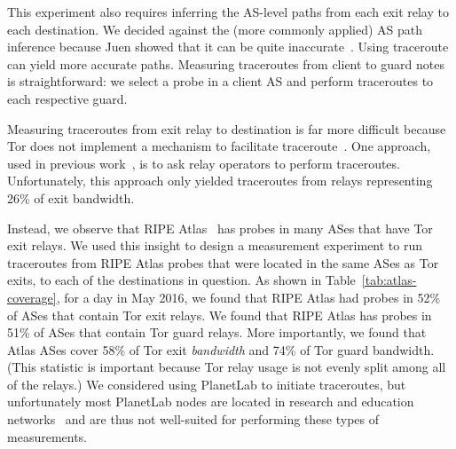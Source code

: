 This experiment also requires inferring the AS-level paths from
each exit relay to each destination. We decided against the (more
commonly applied) AS path inference because Juen \ea showed that it can
be quite inaccurate~\cite{Juen2015a}.  Using traceroute can yield more
accurate paths.  Measuring traceroutes from client to guard notes is
straightforward: we select a probe in a client AS and perform
traceroutes to each respective guard. 

Measuring traceroutes from exit relay to destination is far more
difficult because Tor does not implement a mechanism to facilitate
traceroute~\cite{Murdoch2007a}.  One approach, used in previous
work~\cite{Juen2015a}, is to ask relay operators to perform traceroutes.
Unfortunately, this approach only yielded traceroutes from relays
representing 26\% of exit bandwidth.  

Instead, we observe that RIPE
Atlas~\cite{atlas} has probes in many ASes that have Tor exit relays.
We used this insight to design a measurement experiment to run
traceroutes from RIPE Atlas probes that were located in the same ASes as
Tor exits, to each of the destinations in question.  As shown in
Table~\ref{tab:atlas-coverage}, for a day in May 2016, we found that
RIPE Atlas had probes in 52\% of ASes that contain Tor exit relays.  We
found that RIPE Atlas has probes in 51\% of ASes that contain Tor guard
relays.  More importantly, we found that Atlas ASes cover 58\% of Tor
exit \textit{bandwidth} and 74\% of Tor guard bandwidth. (This statistic
is important because Tor relay usage is not evenly split among all of
the relays.) We considered using PlanetLab to initiate traceroutes, but
unfortunately most PlanetLab nodes are located in research and education
networks~\cite{banerjee2004interdomain} and are thus not well-suited for
performing these types of measurements.
  

